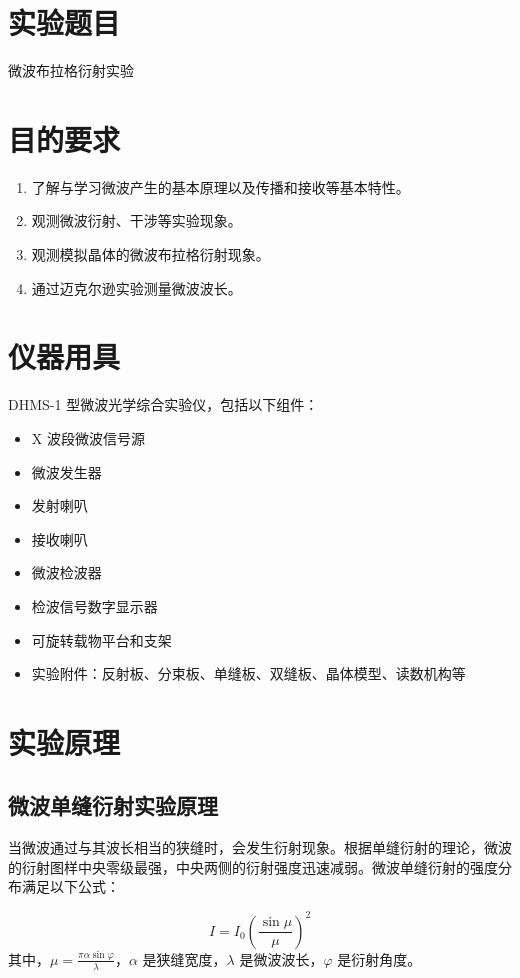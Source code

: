 \documentclass[zihao=5, UTF8]{article}
\theoremstyle{MyLineTheoremStyle} %
\theoremstyle{MyBlockTheoremStyle} %
\theoremstyle{MySubsubsectionStyle} %
\begin{document}
\section{实验题目}\thispagestyle{fancy} 
微波布拉格衍射实验

\section{目的要求}
\begin{enumerate}
    \item 了解与学习微波产生的基本原理以及传播和接收等基本特性。
    \item 观测微波衍射、干涉等实验现象。
    \item 观测模拟晶体的微波布拉格衍射现象。
    \item 通过迈克尔逊实验测量微波波长。
\end{enumerate}

\section{仪器用具}
DHMS-1 型微波光学综合实验仪，包括以下组件：

\begin{itemize}
    \item X 波段微波信号源
    \item 微波发生器
    \item 发射喇叭
    \item 接收喇叭
    \item 微波检波器
    \item 检波信号数字显示器
    \item 可旋转载物平台和支架
    \item 实验附件：反射板、分束板、单缝板、双缝板、晶体模型、读数机构等
\end{itemize}

\section{实验原理}
\subsection{微波单缝衍射实验原理}
当微波通过与其波长相当的狭缝时，会发生衍射现象。根据单缝衍射的理论，微波的衍射图样中央零级最强，中央两侧的衍射强度迅速减弱。微波单缝衍射的强度分布满足以下公式：

\[
I = I_0 \left( \frac{\sin\mu}{\mu} \right)^2
\]
其中，$\mu = \frac{\pi \alpha \sin \varphi}{\lambda}$，$\alpha$ 是狭缝宽度，$\lambda$ 是微波波长，$\varphi$ 是衍射角度。
\end{document}
